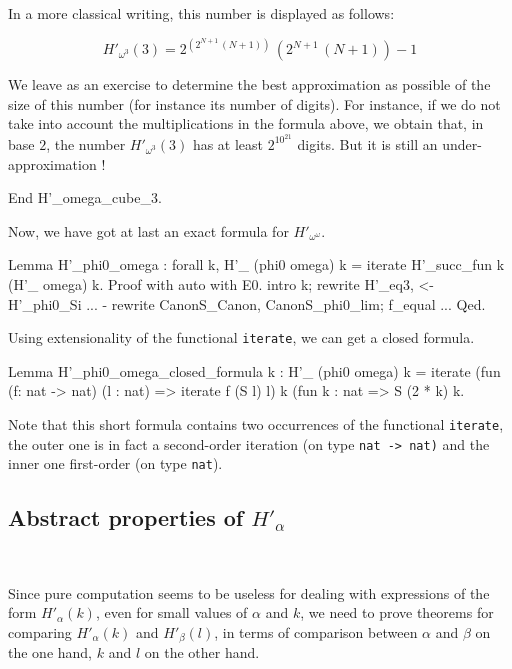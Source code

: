 In a more classical writing, this number is displayed as follows:

{\Large
$$
H'_{\omega^3}(3) =  2 ^ {(2 ^ {N + 1} \, (N+1) )}   \,  (2 ^ {N+1} \, ( N +1) ) - 1
$$
}


We leave as an exercise to determine the best approximation as possible of
 the size of this number (for instance its number of digits).  For instance, if
we do not take into account the multiplications in the formula above,
we obtain that, in base $2$, the number $H'_{\omega^3}(3)$ has at least
$2^{10^{21}}$  digits. But it is still an under-approximation !


\begin{Coqsrc}
End H'_omega_cube_3.
\end{Coqsrc}




Now, we have got at last an exact formula for $H'_{\omega^\omega}$.

\begin{Coqsrc}
Lemma H'_phi0_omega : forall k, H'_ (phi0 omega) k =
                               iterate H'_succ_fun  k (H'_ omega) k.
Proof with auto with E0.
  intro k; rewrite H'_eq3, <- H'_phi0_Si ...
  -  rewrite CanonS_Canon, CanonS_phi0_lim;  f_equal ...
Qed.
\end{Coqsrc}

Using extensionality of the functional \texttt{iterate}, we can get a closed formula.

\begin{Coqsrc}
Lemma H'_phi0_omega_closed_formula k :
  H'_ (phi0 omega) k =
  iterate (fun (f: nat -> nat) (l : nat) => iterate  f (S l) l)
               k
               (fun k : nat => S (2 * k)%
               k.
\end{Coqsrc}




Note that this short formula contains two occurrences of the functional \texttt{iterate}, the outer one is in fact a second-order iteration (on type \texttt{nat -> nat)}
and the inner one  first-order (on type \texttt{nat}). 


\subsection{Abstract properties of  
\texorpdfstring{$H'_\alpha$}{H'}}
~\label{sect:H-alpha-prop} 

Since pure computation seems to be useless for dealing with expressions of the form $H'_\alpha(k)$, even for small values of $\alpha$ and $k$, we need to prove theorems for comparing $H'_\alpha(k)$ and $H'_\beta(l)$, in terms of comparison
between $\alpha$ and $\beta$ on the one hand, $k$ and $l$ on the other hand.

